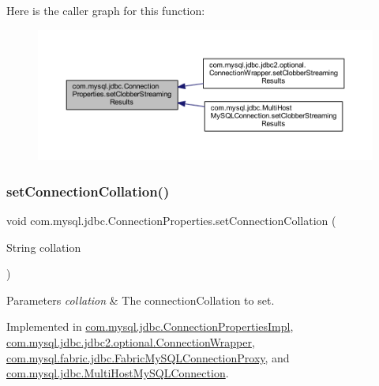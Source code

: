 Here is the caller graph for this function\+:\nopagebreak
\begin{figure}[H]
\begin{center}
\leavevmode
\includegraphics[width=350pt]{interfacecom_1_1mysql_1_1jdbc_1_1_connection_properties_a3bb976fbcde1b60e4dae84b49320de5f_icgraph}
\end{center}
\end{figure}
\mbox{\label{interfacecom_1_1mysql_1_1jdbc_1_1_connection_properties_a69729667beed7cc9989d0b736d2cc28d}} 
\subsubsection{\texorpdfstring{set\+Connection\+Collation()}{setConnectionCollation()}}
{\footnotesize\ttfamily void com.\+mysql.\+jdbc.\+Connection\+Properties.\+set\+Connection\+Collation (\begin{DoxyParamCaption}\item[{String}]{collation }\end{DoxyParamCaption})}


\begin{DoxyParams}{Parameters}
{\em collation} & The connection\+Collation to set. \\
\hline
\end{DoxyParams}


Implemented in \mbox{\hyperlink{classcom_1_1mysql_1_1jdbc_1_1_connection_properties_impl_a2f3f37ab6830d458a0e9ce843ad48c3d}{com.\+mysql.\+jdbc.\+Connection\+Properties\+Impl}}, \mbox{\hyperlink{classcom_1_1mysql_1_1jdbc_1_1jdbc2_1_1optional_1_1_connection_wrapper_a663eda436c1079c803042e8496d17549}{com.\+mysql.\+jdbc.\+jdbc2.\+optional.\+Connection\+Wrapper}}, \mbox{\hyperlink{classcom_1_1mysql_1_1fabric_1_1jdbc_1_1_fabric_my_s_q_l_connection_proxy_af37eea6c8c5829fa8ef85ca03b1c5940}{com.\+mysql.\+fabric.\+jdbc.\+Fabric\+My\+S\+Q\+L\+Connection\+Proxy}}, and \mbox{\hyperlink{classcom_1_1mysql_1_1jdbc_1_1_multi_host_my_s_q_l_connection_ac34db9416951ec25adb28a76cffe5844}{com.\+mysql.\+jdbc.\+Multi\+Host\+My\+S\+Q\+L\+Connection}}.

